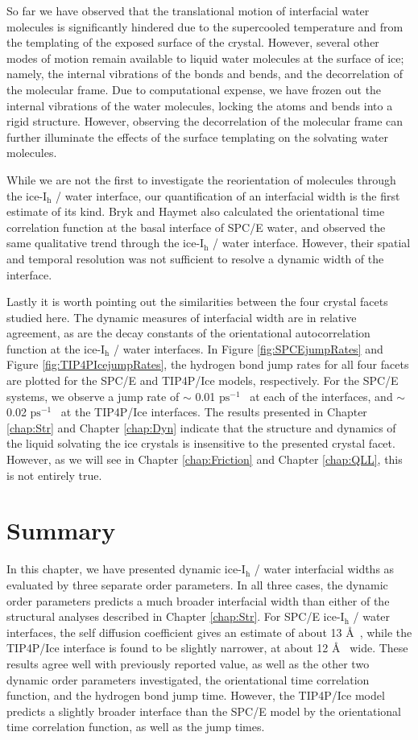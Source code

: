 So far we have observed that the translational motion of interfacial
water molecules is significantly hindered due to the supercooled
temperature and from the templating of the exposed surface of the
crystal. However, several other modes of motion remain available to
liquid water molecules at the surface of ice; namely, the internal
vibrations of the bonds and bends, and the decorrelation of the
molecular frame. Due to computational expense, we have frozen out the
internal vibrations of the water molecules, locking the atoms and
bends into a rigid structure. However, observing the decorrelation of
the molecular frame can further illuminate the effects of the surface
templating on the solvating water molecules.

While we are not the first to investigate the reorientation of
molecules through the ice-I$_\mathrm{h}$ / water interface, our
quantification of an interfacial width is the first estimate of its
kind. Bryk and Haymet also calculated the orientational time
correlation function at the basal interface of SPC/E
water,\cite{Bryk2002} and observed the same qualitative trend through
the ice-I$_\mathrm{h}$ / water interface. However, their spatial and
temporal resolution was not sufficient to resolve a dynamic width of
the interface.

Lastly it is worth pointing out the similarities between the four
crystal facets studied here. The dynamic measures of interfacial width
are in relative agreement, as are the decay constants of the
orientational autocorrelation function at the ice-I$_\mathrm{h}$ /
water interfaces. In Figure \ref{fig:SPCEjumpRates} and Figure
\ref{fig:TIP4PIcejumpRates}, the hydrogen bond jump rates for all four
facets are plotted for the SPC/E and TIP4P/Ice models,
respectively. For the SPC/E systems, we observe a jump rate of $\sim$
0.01 $\mathrm{ps}^{-1}$~ at each of the interfaces, and $\sim$ 0.02
$\mathrm{ps}^{-1}$~ at the TIP4P/Ice interfaces. The results presented
in Chapter \ref{chap:Str} and Chapter \ref{chap:Dyn} indicate that the
structure and dynamics of the liquid solvating the ice crystals is
insensitive to the presented crystal facet. However, as we will see in
Chapter \ref{chap:Friction} and Chapter \ref{chap:QLL}, this is not
entirely true.


\section{Summary}
In this chapter, we have presented dynamic ice-I$_\mathrm{h}$ / water
interfacial widths as evaluated by three separate order parameters. In
all three cases, the dynamic order parameters predicts a much broader
interfacial width than either of the structural analyses described in
Chapter \ref{chap:Str}.  For SPC/E ice-I$_\mathrm{h}$ / water
interfaces, the self diffusion coefficient gives an estimate of about
13 \AA~, while the TIP4P/Ice interface is found to be slightly
narrower, at about 12 \AA~ wide. These results agree well with
previously reported value, as well as the other two dynamic order
parameters investigated, the orientational time correlation function,
and the hydrogen bond jump time. However, the TIP4P/Ice model predicts
a slightly broader interface than the SPC/E model by the orientational
time correlation function, as well as the jump times.
